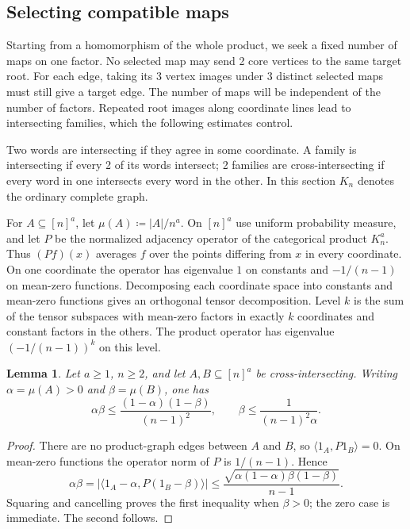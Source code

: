 \documentclass[10pt]{article}
\numberwithin{equation}{section}
\newtheorem{lemma}[lemma]{Lemma}\aliascntresetthe{lemma}
\theoremstyle{definition}
\begin{document}
\subsection{Selecting compatible maps}\label{sec:selector}

Starting from a homomorphism of the whole product, we seek a fixed number of maps on one factor. No selected map may send 2 core vertices to the same target root. For each edge, taking its 3 vertex images under 3 distinct selected maps must still give a target edge. The number of maps will be independent of the number of factors. Repeated root images along coordinate lines lead to intersecting families, which the following estimates control.

Two words are intersecting if they agree in some coordinate. A family is intersecting if every 2 of its words intersect; 2 families are cross-intersecting if every word in one intersects every word in the other. In this section $K_n$ denotes the ordinary complete graph.

For $A\subseteq[n]^a$, let $\mu(A)\coloneqq |A|/n^a$. On $[n]^a$ use uniform probability measure, and let $P$ be the normalized adjacency operator of the categorical product $K_n^a$. Thus $(Pf)(x)$ averages $f$ over the points differing from $x$ in every coordinate. On one coordinate the operator has eigenvalue $1$ on constants and $-1/(n-1)$ on mean-zero functions. Decomposing each coordinate space into constants and mean-zero functions gives an orthogonal tensor decomposition. Level $k$ is the sum of the tensor subspaces with mean-zero factors in exactly $k$ coordinates and constant factors in the others. The product operator has eigenvalue $(-1/(n-1))^k$ on this level.

\begin{lemma}\label{lem:spectral-cross}
Let $a\ge1$, $n\ge2$, and let $A,B\subseteq[n]^a$ be cross-intersecting. Writing $\alpha=\mu(A)>0$ and $\beta=\mu(B)$, one has
\[
 \alpha\beta\le\frac{(1-\alpha)(1-\beta)}{(n-1)^2},
 \qquad
 \beta\le\frac1{(n-1)^2\alpha}.
\]
\end{lemma}
\begin{proof}
There are no product-graph edges between $A$ and $B$, so $\langle 1_A,P1_B\rangle=0$. On mean-zero functions the operator norm of $P$ is $1/(n-1)$. Hence
\[
 \alpha\beta
 =|\langle1_A-\alpha,P(1_B-\beta)\rangle|
 \le\frac{\sqrt{\alpha(1-\alpha)\beta(1-\beta)}}{n-1}.
\]
Squaring and cancelling proves the first inequality when $\beta>0$; the zero case is immediate. The second follows.
\end{proof}
\end{document}
